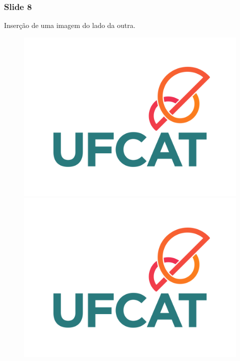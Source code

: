 \documentclass{beamer}
\begin{document}
\begin{frame}
\frametitle{Slide 8}

Inserção de uma imagem do lado da outra.
\begin{figure}[!h]
    \centering
    \begin{minipage}{0.5\textwidth}
        \centering
        \includegraphics[width=0.7\linewidth]{Logo_UFCAT.png} 
    \end{minipage}\hfill
    \begin{minipage}{0.5\textwidth}
        \centering
        \includegraphics[width=0.7\linewidth]{Logo_UFCAT.png}
    \end{minipage}
\end{figure}

\end{frame}
\end{document}
